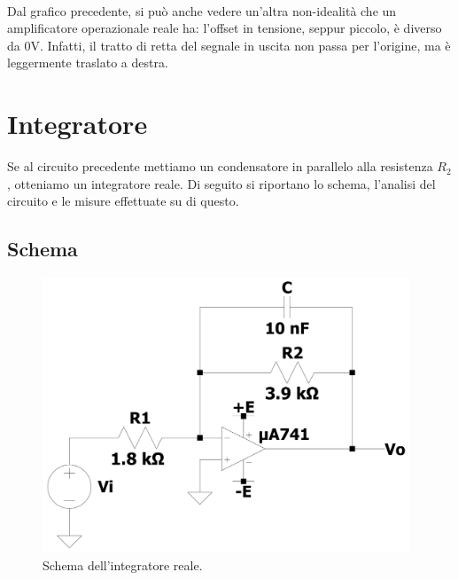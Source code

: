 \documentclass{report}
\begin{document}
\\Dal grafico precedente, si può anche vedere un'altra non-idealità che un amplificatore operazionale reale ha: l'offset in tensione, seppur piccolo, è diverso da 0V. Infatti, il tratto di retta del segnale in uscita non passa per l'origine, ma è leggermente traslato a destra.
\section{Integratore} \label{int_cap}
Se al circuito precedente mettiamo un condensatore in parallelo alla resistenza $R_2$, otteniamo un integratore reale. Di seguito si riportano lo schema, l'analisi del circuito e le misure effettuate su di questo.
\subsection{Schema}
\begin{figure}[h]
\centering
\includegraphics[height=8.2cm]{immagini/int}
\caption{Schema dell'integratore reale.}
\label{figura:int}
\end{figure}
\end{document}
